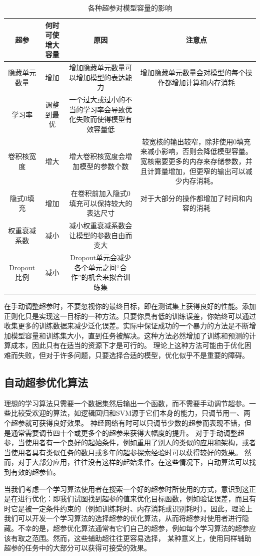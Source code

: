 \begin{table}[!hbp]
    \begin{tabular}{|c|c|c|c|}
        \hline
        \hline
        超参 & 何时可使增大容量 & 原因 & 注意点 \\
        \hline
        隐藏单元数量 & 增加 & 增加隐藏单元数量可以增加模型的表达能力 & 增加隐藏单元数量会对模型的每个操作都增加计算和内存消耗 \\
        \hline
        学习率 & 调整到最优 & 一个过大或过小的不当的学习率会导致优化失败而使得模型有效容量低 & \\
        \hline
        卷积核宽度 & 增大 & 增大卷积核宽度会增加模型的参数个数 & 较宽核的输出较窄，除非使用0填充来减小影响，否则会降低模型容量。宽核需要更多的内存来存储参数，并且计算量增加，但更窄的输出可以减少内存消耗。 \\
        \hline
        隐式0填充 & 增加 & 在卷积前加入隐式0填充可以保持较大的表达尺寸 & 对于大部分的操作都增加了时间和内容的消耗 \\
        \hline
        权重衰减系数 & 减小 & 减小权重衰减系数会让模型的参数自由而变大 &  \\
        \hline
        Dropout比例 & 减小 & Dropout单元会减少各个单元之间“合作”的机会来拟合训练集 &  \\
        \hline
        \hline
    \end{tabular}
    \caption{各种超参对模型容量的影响}
    \label{tab:11.1}
\end{table}

在手动调整超参时，不要忽视你的最终目标，即在测试集上获得良好的性能。添加正则化只是实现这一目标的一种方法。只要你具有低的训练误差，你始终可以通过收集更多的训练数据来减少泛化误差。实际中保证成功的一个暴力的方法是不断增加模型容量和训练集大小，直到任务被解决。这种方法必然增加了训练和预测的计算成本，因此只有在适当的资源下才是可行的。 理论上这种方法可能由于优化困难而失败，但对于许多问题，只要选择合适的模型，优化似乎不是重要的障碍。


\subsection{自动超参优化算法}
理想的学习算法只需要一个数据集然后输出一个函数，而不需要手动调节超参。一些比较受欢迎的算法，如逻辑回归和SVM源于它们本身的能力，只调节用一、两个超参就可获得良好效果。 神经网络有时可以只调节少数的超参而表现不错，但是通常需要调节四十个或更多个的超参来获得大幅度的提升。 对于手动调整超参，当使用者有一个良好的起始条件，例如重用了别人的类似的应用和架构，或者当使用者具有类似任务的数月或多年的超参探索经验时可以获得较好的效果。 然而，对于大部分应用，往往没有这样的起始条件。在这些情况下，自动算法可以找到有效的超参值。

当我们考虑一个学习算法使用者在搜索一个好的超参时所使用的方式，意识到这正是在进行优化：即我们试图找到超参的值来优化目标函数，例如验证误差，而且有时它是被一定条件约束的（例如训练耗时、内存消耗或识别耗时）。因此，理论上我们可以开发一个学习算法的选择超参的优化算法，从而将超参对使用者进行隐藏。不幸的是，超参优化算法通常有它们自己的超参，例如每个学习算法的超参应该有取之范围。然而，这些辅助超往往更容易选择， 某种意义上，使用同样辅助超参的任务中的大部分可以获得可接受的效果。

